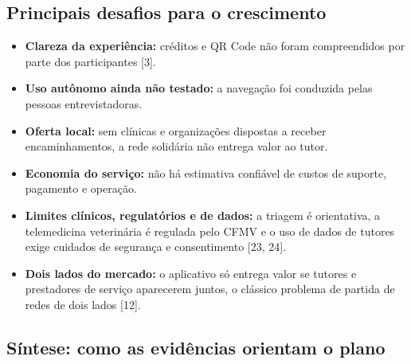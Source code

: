 \documentclass[12pt,a4paper]{article}
\begin{document}
\subsection{Principais desafios para o crescimento}

\begin{itemize}
\item \textbf{Clareza da experiência:} créditos e QR Code não foram compreendidos por parte dos participantes [3].
\item \textbf{Uso autônomo ainda não testado:} a navegação foi conduzida pelas pessoas entrevistadoras.
\item \textbf{Oferta local:} sem clínicas e organizações dispostas a receber encaminhamentos, a rede solidária não entrega valor ao tutor.
\item \textbf{Economia do serviço:} não há estimativa confiável de custos de suporte, pagamento e operação.
\item \textbf{Limites clínicos, regulatórios e de dados:} a triagem é orientativa, a telemedicina veterinária é regulada pelo CFMV e o uso de dados de tutores exige cuidados de segurança e consentimento [23, 24].
\item \textbf{Dois lados do mercado:} o aplicativo só entrega valor se tutores e prestadores de serviço aparecerem juntos, o clássico problema de partida de redes de dois lados [12].
\end{itemize}

\subsection{Síntese: como as evidências orientam o plano}
\end{document}
